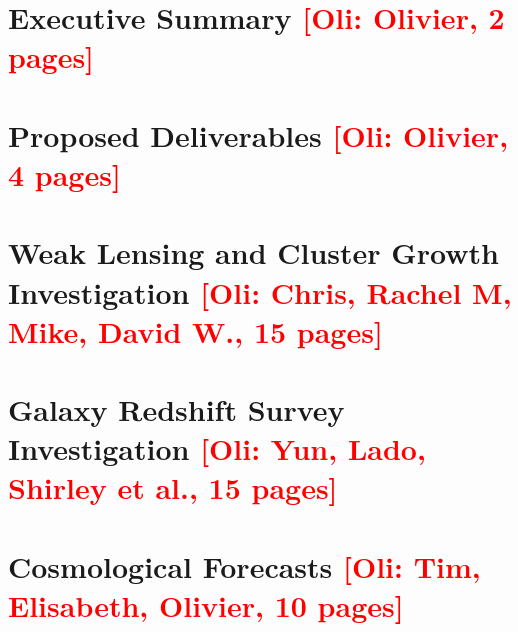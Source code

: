 \documentclass[a4paper]{ar-1col_WFIRST-HLS}
\newcommand{\Oli}[1]{\textcolor{red}{[{\bf Oli}: #1]}}
\begin{document}
\section{Executive Summary \Oli{Olivier, 2 pages}}
\label{sec:executive_summary}



\section{Proposed Deliverables \Oli{Olivier, 4 pages}}
\label{sec:deliverables}


%

\section{Weak Lensing and Cluster Growth Investigation \Oli{Chris,
    Rachel M, Mike, David W., 15 pages}}
\label{sec:wl_gal-clusters}


\section{Galaxy Redshift Survey Investigation \Oli{Yun, Lado, Shirley et al., 15 pages}}
\label{sec:gc}


\section{Cosmological Forecasts \Oli{Tim, Elisabeth, Olivier, 10 pages}}
\label{sec:forecast}

\end{document}
